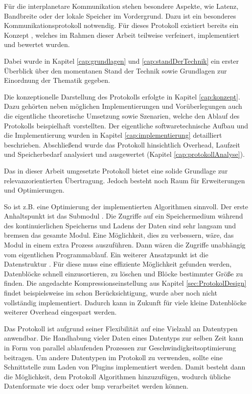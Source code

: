 Für die interplanetare Kommunikation stehen besondere Aspekte, wie Latenz,
Bandbreite oder der lokale Speicher im Vordergrund. Dazu ist ein besonderes
Kommunikationsprotokoll notwendig. Für dieses Protokoll existiert
bereits ein Konzept \cite{Daher}, welches im Rahmen dieser Arbeit
teilweise verfeinert, implementiert und bewertet wurden.

Dabei wurde in Kapitel \ref{cap:grundlagen} und \ref{cap:standDerTechnik} ein
erster Überblick über den momentanen Stand der Technik sowie Grundlagen zur
Einordnung der Thematik gegeben.

Die konzeptionelle Darstellung des Protokolls erfolgte in Kapitel
\ref{cap:konzept}. Dazu gehörten neben möglichen Implementierungen und
Vorüberlegungen auch die eigentliche theoretische Umsetzung sowie Szenarien,
welche den Ablauf des Protokolls beispielhaft vorstellten. Der eigentliche
softwaretechnische Aufbau und die Implementierung wurden in Kapitel
\ref{cap:implementierung} detailliert beschrieben. Abschließend wurde das
Protokoll hinsichtlich Overhead, Laufzeit und Speicherbedarf analysiert und
ausgewertet (Kapitel \ref{cap:protokollAnalyse}).

Das in dieser Arbeit umgesetzte Protokoll bietet eine solide
Grundlage zur relevanzorientierten Übertragung. Jedoch besteht noch Raum
für Erweiterungen und Optimierungen.

So ist z.B. eine Optimierung der implementierten Algorithmen sinnvoll.
Der erste Anhaltspunkt ist das Submodul .
Die Zugriffe auf ein Speichermedium während des kontinuierlichen Speicherns und
Ladens der Daten sind sehr langsam und bremsen das gesamte Modul. Eine Möglichkeit, dies zu
verbessern, wäre, das Modul in einem extra Prozess auszuf{\"u}hren. Dann wären
die Zugriffe unabhängig vom eigentlichen Programmablauf. Ein weiterer
Ansatzpunkt ist die Datenstruktur . Für diese muss
eine effiziente Möglichkeit gefunden werden, Datenblöcke schnell einzusortieren,
zu löschen und Bl{\"o}cke bestimmter Größe zu finden.
Die angedachte Kompressionseinstellung aus Kapitel \ref{sec:ProtokolDesign}
findet beispielsweise im  schon Berücksichtigung, wurde aber
noch nicht vollständig implementiert. Dadurch kann in Zukunft für viele kleine
Datenblöcke weiterer Overhead eingespart werden.

Das Protokoll ist aufgrund seiner Flexibilität auf eine Vielzahl an Datentypen
anwendbar. Die Handhabung vieler Daten eines Datentyps zur selben Zeit kann
in Form von parallel ablaufenden Prozessen zur Geschwindigkeitsoptimierung
beitragen. Um andere Datentypen im Protokoll zu verwenden, sollte eine
Schnittstelle zum Laden von Plugins implementiert werden. Damit besteht dann die
Möglichkeit, dem Protokoll Algorithmen hinzuzufügen, wodurch
übliche Datenformate wie docx oder bmp verarbeitet werden können.

